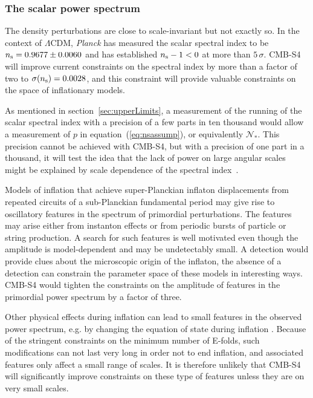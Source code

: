 \subsubsection{The scalar power spectrum}
The density perturbations are close to scale-invariant but not exactly so. In the context of $\Lambda$CDM, {\it Planck\/} has measured the scalar spectral index to be $n_{\rm s}=0.9677\pm0.0060$ and has established $n_{\rm s}-1<0$ at more than $5\,\sigma$. CMB-S4 will improve current constraints on the spectral index by more than a factor of two to $\sigma(n_{\rm s})=0.0028$, and this constraint will provide valuable constraints on the space of inflationary models. 

As mentioned in section~\ref{sec:upperLimits}, a measurement of the running of the scalar spectral index with a precision of a few parts in ten thousand would allow a measurement of $p$ in equation~(\ref{eq:nsassump}), or equivalently $\mathcal{N}_\ast$. This precision cannot be achieved with CMB-S4, but with a precision of one part in a thousand, it will test the idea that the lack of power on large angular scales might be explained by scale dependence of the spectral index~\cite{Meerburg:2014bpa}.  

Models of inflation that achieve super-Planckian inflaton displacements from repeated circuits of a sub-Planckian fundamental period may give rise to oscillatory features in the spectrum of primordial perturbations. The features may arise either from instanton effects or from periodic bursts of particle or string production. A search for such features is well motivated even though the amplitude is model-dependent and may be undetectably small. A detection would provide clues about the microscopic origin of the inflaton, the absence of a detection can constrain the parameter space of these models in interesting ways. CMB-S4 would tighten the constraints on the amplitude of features in the primordial power spectrum by a factor of three. 

Other physical effects during inflation can lead to small features in the observed power spectrum, e.g. by changing the equation of state during inflation \cite{Achucarro:2014msa}. Because of the stringent constraints on the minimum number of E-folds, such modifications can not last very long in order not to end inflation, and associated features only affect a small range of scales. It is therefore unlikely that CMB-S4 will significantly improve constraints on these type of features unless they are on very small scales. 

